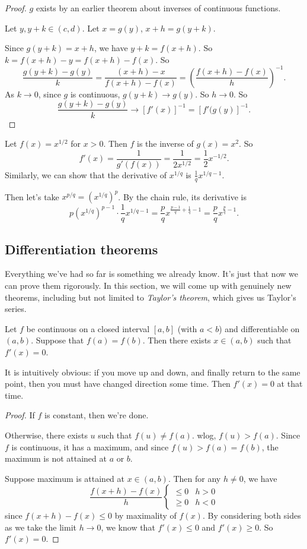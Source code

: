 \documentclass[a4paper]{article}
\begin{document}
\begin{proof}
  $g$ exists by an earlier theorem about inverses of continuous functions.

  Let $y, y + k\in (c, d)$. Let $x = g(y)$, $x + h = g(y + k)$.

  Since $g(y + k) = x + h$, we have $y + k = f(x + h)$. So $k = f(x + h) - y = f(x + h) - f(x)$. So
  \[
    \frac{g(y + k) - g(y)}{k} = \frac{(x + h) - x}{f(x + h) - f(x)} = \left(\frac{f(x + h) - f(x)}{h}\right)^{-1}.
  \]
  As $k \to 0$, since $g$ is continuous, $g(y + k) \to g(y)$. So $h \to 0$. So
  \[
    \frac{g(y + k) - g(y)}{k} \to [f'(x)]^{-1} = [f'(g(y)]^{-1}.
  \]
\end{proof}

\begin{eg}
  Let $f(x) = x^{1/2}$ for $x > 0$. Then $f$ is the inverse of $g(x) = x^2$. So
  \[
    f'(x) = \frac{1}{g'(f(x))} = \frac{1}{2x^{1/2}} = \frac{1}{2}x^{-1/2}.
  \]
  Similarly, we can show that the derivative of $x^{1/q}$ is $\frac{1}{q}x^{1/q - 1}$.

  Then let's take $x^{p/q} = (x^{1/q})^p$. By the chain rule, its derivative is
  \[
    p(x^{1/q})^{p - 1}\cdot \frac{1}{q}x^{1/q - 1} = \frac{p}{q}x^{\frac{p - 1}{q} + \frac{1}{q} - 1} = \frac{p}{q}x^{\frac{p}{q} - 1}.
  \]
\end{eg}

\subsection{Differentiation theorems}
Everything we've had so far is something we already know. It's just that now we can prove them rigorously. In this section, we will come up with genuinely new theorems, including but not limited to \emph{Taylor's theorem}, which gives us Taylor's series.

\begin{thm}
  Let $f$ be continuous on a closed interval $[a, b]$ (with $a < b$) and differentiable on $(a, b)$. Suppose that $f(a) = f(b)$. Then there exists $x\in (a, b)$ such that $f'(x) = 0 $.
\end{thm}
It is intuitively obvious: if you move up and down, and finally return to the same point, then you must have changed direction some time. Then $f'(x) = 0$ at that time.

\begin{proof}
  If $f$ is constant, then we're done.

  Otherwise, there exists $u$ such that $f(u) \not= f(a)$. wlog, $f(u) > f(a)$. Since $f$ is continuous, it has a maximum, and since $f(u) > f(a) = f(b)$, the maximum is not attained at $a$ or $b$.

  Suppose maximum is attained at $x\in (a, b)$. Then for any $h \not = 0$, we have
  \[
    \frac{f(x + h) - f(x)}{h}
    \begin{cases}
      \leq 0 & h > 0\\
      \geq 0 & h < 0
    \end{cases}
  \]
  since $f(x + h) - f(x) \leq 0$ by maximality of $f(x)$. By considering both sides as we take the limit $h\to 0$, we know that $f'(x) \leq 0$ and $f'(x) \geq 0$. So $f'(x) = 0$.
\end{proof}
\end{document}
